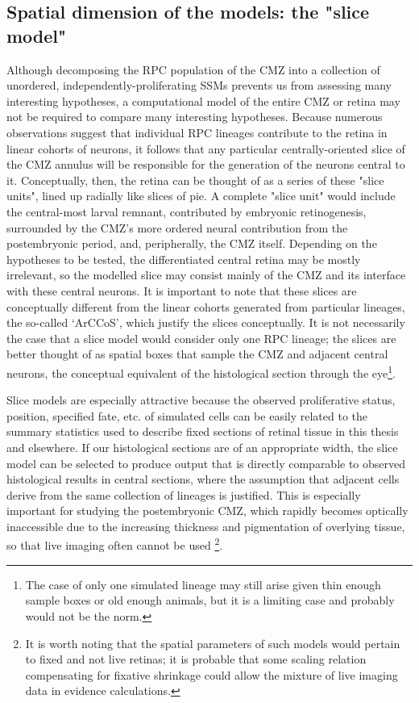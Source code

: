 \subsection{Spatial dimension of the models: the "slice model"}
\label{ssec:slice}
Although decomposing the RPC population of the CMZ into a collection of unordered, independently-proliferating SSMs prevents us from assessing many interesting hypotheses, a computational model of the entire CMZ or retina may not be required to compare many interesting hypotheses. Because numerous observations suggest that individual RPC lineages contribute to the retina in linear cohorts of neurons, it follows that any particular centrally-oriented slice of the CMZ annulus will be responsible for the generation of the neurons central to it. Conceptually, then, the retina can be thought of as a series of these "slice units", lined up radially like slices of pie. A complete "slice unit" would include the central-most larval remnant, contributed by embryonic retinogenesis, surrounded by the CMZ's more ordered neural contribution from the postembryonic period, and, peripherally, the CMZ itself. Depending on the hypotheses to be tested, the differentiated central retina may be mostly irrelevant, so the modelled slice may consist mainly of the CMZ and its interface with these central neurons. It is important to note that these slices are conceptually different from the linear cohorts generated from particular lineages, the so-called `ArCCoS', which justify the slices conceptually. It is not necessarily the case that a slice model would consider only one RPC lineage; the slices are better thought of as spatial boxes that sample the CMZ and adjacent central neurons, the conceptual equivalent of the histological section through the eye\footnote{The case of only one simulated lineage may still arise given thin enough sample boxes or old enough animals, but it is a limiting case and probably would not be the norm.}.

Slice models are especially attractive because the observed proliferative status, position, specified fate, etc. of simulated cells can be easily related to the summary statistics used to describe fixed sections of retinal tissue in this thesis and elsewhere. If our histological sections are of an appropriate width, the slice model can be selected to produce output that is directly comparable to observed histological results in central sections, where the assumption that adjacent cells derive from the same collection of lineages is justified. This is especially important for studying the postembryonic CMZ, which rapidly becomes optically inaccessible due to the increasing thickness and pigmentation of overlying tissue, so that live imaging often cannot be used \footnote{It is worth noting that the spatial parameters of such models would pertain to fixed and not live retinas; it is probable that some scaling relation compensating for fixative shrinkage could allow the mixture of live imaging data in evidence calculations.}.

